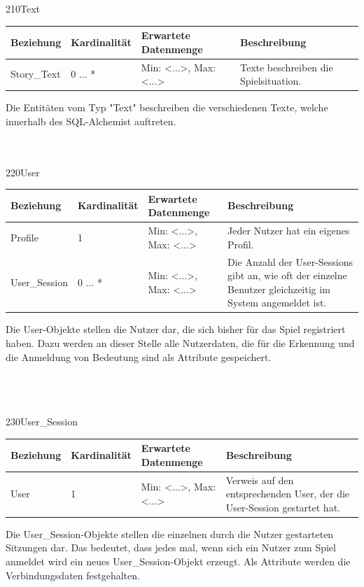 \begin{entity}{210}{Text}
\begin{center}
	\begin{longtable}{|m{4cm}|m{}|m{}|m{}|}
 	 \hline
 	 \textbf{Beziehung} & \textbf{Kardinalität} &  \textbf{Erwartete Datenmenge} & \textbf{Beschreibung} \\
  	\hline
  	Story\_Text & 0 ... * & Min: <...>, Max: <...> & Texte beschreiben die Spielsituation.\\
  	\hline
	\end{longtable}
\end{center}
Die Entitäten vom Typ "Text" beschreiben die verschiedenen Texte, welche innerhalb des SQL-Alchemist auftreten.\\\\\
\end{entity}

\begin{entity}{220}{User}
\begin{center}
	\begin{longtable}{|m{4cm}|m{}|m{}|m{}|}
 	 \hline
 	 \textbf{Beziehung} & \textbf{Kardinalität} &  \textbf{Erwartete Datenmenge} & \textbf{Beschreibung} \\
  	\hline
	  Profile & 1 & Min: <...>, Max: <...> & Jeder Nutzer hat ein eigenes Profil.\\
	  \hline
	  User\_Session & 0 ... * & Min: <...>, Max: <...> & Die Anzahl der User-Sessions gibt an, wie oft der einzelne Benutzer gleichzeitig im System angemeldet ist.\\
	  \hline
	\end{longtable}
\end{center}
Die \glqq User\grqq-Objekte stellen die Nutzer dar, die sich bisher für das Spiel registriert haben. Dazu werden an dieser Stelle alle Nutzerdaten, die für die Erkennung und die Anmeldung von Bedeutung sind als Attribute gespeichert.\\\\\\\
\end{entity}

\begin{entity}{230}{User\_Session}
\begin{center}
	\begin{longtable}{|m{4cm}|m{2,5cm}|m{4,5cm}|m{3,5cm}|}
 	 \hline
 	 \textbf{Beziehung} & \textbf{Kardinalität} &  \textbf{Erwartete Datenmenge} & \textbf{Beschreibung} \\
  	\hline
  	User & 1 & Min: <...>, Max: <...> & Verweis auf den entsprechenden User, der die User-Session gestartet hat.\\
	  \hline
	\end{longtable}
\end{center}
Die \glqq User\_Session\grqq-Objekte stellen die einzelnen durch die Nutzer gestarteten Sitzungen dar. Das bedeutet, dass jedes mal, wenn sich ein Nutzer zum Spiel anmeldet wird ein neues \glqq User\_Session\grqq-Objekt erzeugt. Als Attribute werden die Verbindungsdaten festgehalten.
\end{entity}


